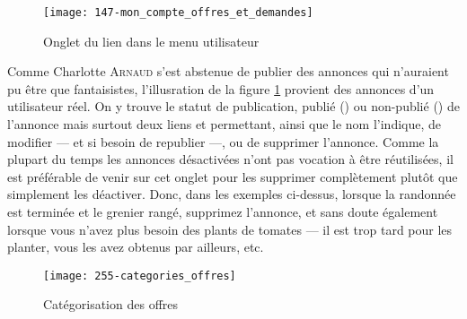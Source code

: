 \begin{figure}
    \texttt{[image: 147-mon\_compte\_offres\_et\_demandes]}
    \caption[Onglet <<~Offres et demandes~>> du lien <<~Mon compte~>> dans le menu utilisateur]{Onglet  du lien  dans le menu utilisateur}
    \label{fig:compte_offres_demandes}
\end{figure}
Comme Charlotte \textsc{Arnaud} s'est abstenue de publier des annonces qui n'auraient pu être que fantaisistes, l'illusration de la figure \ref{fig:compte_offres_demandes} provient des annonces d'un utilisateur réel. On y trouve le statut de publication, publié () ou non-publié () de l'annonce mais surtout deux liens  et  permettant, ainsi que le nom l'indique, de modifier --- et si besoin de republier ---, ou de supprimer l'annonce. Comme la plupart du temps les annonces désactivées n'ont pas vocation à être réutilisées, il est préférable de venir sur cet onglet pour les supprimer complètement plutôt que simplement les déactiver. Donc, dans les exemples ci-dessus, lorsque la randonnée est terminée et le grenier rangé, supprimez l'annonce, et sans doute également lorsque vous n'avez plus besoin des plants de tomates  --- il est trop tard pour les planter, vous les avez obtenus par ailleurs, etc.




    \begin{figure}
        \centering
        \texttt{[image: 255-categories\_offres]}
        \caption{Catégorisation des offres}
        \label{fig:categories_offres}
    \end{figure}
    
